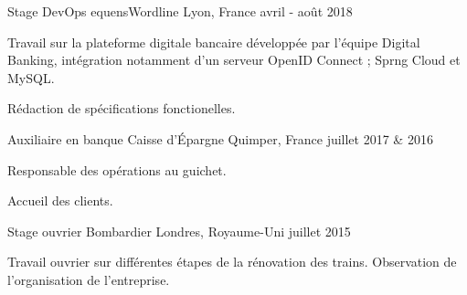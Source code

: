 

\begin{cventries}

  \cventry
    {Stage DevOps} %
    {equensWordline} %
    {Lyon, France} %
    {avril - août 2018} %
    {
      \begin{cvitems} %
        \item {Travail sur la plateforme digitale bancaire développée par l'équipe Digital Banking, intégration notamment d'un serveur OpenID Connect ; Sprng Cloud et MySQL.}
        \item {Rédaction de spécifications fonctionelles.}
      \end{cvitems}
    } 

  \cventry
    {Auxiliaire en banque} %
    {Caisse d'Épargne} %
    {Quimper, France} %
    {juillet 2017 \& 2016} %
    {
      \begin{cvitems} %
        \item {Responsable des opérations au guichet.}
        \item {Accueil des clients.}
      \end{cvitems}
    } 

  \cventry
    {Stage ouvrier} %
    {Bombardier} %
    {Londres, Royaume-Uni} %
    {juillet 2015} %
    {
      \begin{cvitems} %
        \item {Travail ouvrier sur différentes étapes de la rénovation des trains. Observation de l'organisation de l'entreprise.}
      \end{cvitems}
    }


\end{cventries}
